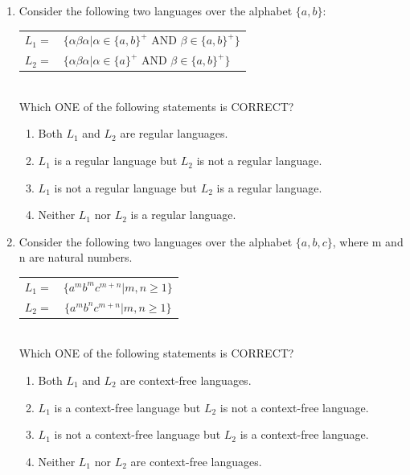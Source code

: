 \documentclass[a4paper, 11pt]{article}
\begin{document}
\begin{enumerate}
    \item Consider the following two languages over the alphabet $\{a, b\}$:\\
    \begin{tabular}{ll}
    $L_1 =$& $\{\alpha\beta\alpha | \alpha \in \{a,b\}^+ \text{ AND } \beta \in \{a,b\}^+\}$\\
    $L_2 = $ & $\{\alpha\beta\alpha | \alpha \in \{a\}^+ \text{ AND } \beta \in \{a,b\}^+\}$
    \end{tabular}\\
    Which ONE of the following statements is CORRECT?
    \begin{enumerate}
        \item Both $L_1$ and $L_2$ are regular languages.
        \item $L_1$ is a regular language but $L_2$ is not a regular language.
        \item $L_1$ is not a regular language but $L_2$ is a regular language.
        \item Neither $L_1$ nor $L_2$ is a regular language.
    \end{enumerate}
    \hfill{}
    \item Consider the following two languages over the alphabet $\{a, b, c\}$, where m and n are natural numbers.\\
    \begin{tabular}{cc}
        $L_1 =$ & $ \{a^m b^m c^{m+n} | m,n \ge 1\}$ \\
        $L_2 =$ & $\{a^m b^n c^{m+n} | m,n \ge 1\}$
    \end{tabular}\\
    Which ONE of the following statements is CORRECT?
    \begin{enumerate}
        \item Both $L_1$ and $L_2$ are context-free languages.
        \item $L_1$ is a context-free language but $L_2$ is not a context-free language.
        \item $L_1$ is not a context-free language but $L_2$ is a context-free language.
        \item Neither $L_1$ nor $L_2$ are context-free languages.
    \end{enumerate}

    \hfill{}


\end{enumerate}
\end{document}
